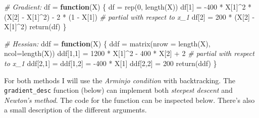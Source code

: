 \documentclass[
]{book}
\newenvironment{Shaded}{\begin{snugshade}}{\end{snugshade}}
\newcommand{\AttributeTok}[1]{\textcolor[rgb]{0.77,0.63,0.00}{#1}}
\newcommand{\CommentTok}[1]{\textcolor[rgb]{0.56,0.35,0.01}{\textit{#1}}}
\newcommand{\ControlFlowTok}[1]{\textcolor[rgb]{0.13,0.29,0.53}{\textbf{#1}}}
\newcommand{\DecValTok}[1]{\textcolor[rgb]{0.00,0.00,0.81}{#1}}
\newcommand{\FunctionTok}[1]{\textcolor[rgb]{0.00,0.00,0.00}{#1}}
\newcommand{\NormalTok}[1]{#1}
\newcommand{\OtherTok}[1]{\textcolor[rgb]{0.56,0.35,0.01}{#1}}
\newcommand{\SpecialCharTok}[1]{\textcolor[rgb]{0.00,0.00,0.00}{#1}}
\begin{document}
\begin{Shaded}
\begin{Highlighting}[]
\CommentTok{\# Gradient:}
\NormalTok{df }\OtherTok{=} \ControlFlowTok{function}\NormalTok{(X) \{}
\NormalTok{  df }\OtherTok{=} \FunctionTok{rep}\NormalTok{(}\DecValTok{0}\NormalTok{, }\FunctionTok{length}\NormalTok{(X))}
\NormalTok{  df[}\DecValTok{1}\NormalTok{] }\OtherTok{=} \SpecialCharTok{{-}}\DecValTok{400} \SpecialCharTok{*}\NormalTok{ X[}\DecValTok{1}\NormalTok{]}\SpecialCharTok{\^{}}\DecValTok{2} \SpecialCharTok{*}\NormalTok{ (X[}\DecValTok{2}\NormalTok{] }\SpecialCharTok{{-}}\NormalTok{ X[}\DecValTok{1}\NormalTok{]}\SpecialCharTok{\^{}}\DecValTok{2}\NormalTok{) }\SpecialCharTok{{-}} \DecValTok{2} \SpecialCharTok{*}\NormalTok{ (}\DecValTok{1} \SpecialCharTok{{-}}\NormalTok{ X[}\DecValTok{1}\NormalTok{]) }\CommentTok{\# partial with respect to x\_1}
\NormalTok{  df[}\DecValTok{2}\NormalTok{] }\OtherTok{=} \DecValTok{200} \SpecialCharTok{*}\NormalTok{ (X[}\DecValTok{2}\NormalTok{] }\SpecialCharTok{{-}}\NormalTok{ X[}\DecValTok{1}\NormalTok{]}\SpecialCharTok{\^{}}\DecValTok{2}\NormalTok{)}
  \FunctionTok{return}\NormalTok{(df)}
\NormalTok{\}}

\CommentTok{\# Hessian:}
\NormalTok{ddf }\OtherTok{=} \ControlFlowTok{function}\NormalTok{(X) \{}
\NormalTok{  ddf }\OtherTok{=} \FunctionTok{matrix}\NormalTok{(}\AttributeTok{nrow =} \FunctionTok{length}\NormalTok{(X), }\AttributeTok{ncol=}\FunctionTok{length}\NormalTok{(X))}
\NormalTok{  ddf[}\DecValTok{1}\NormalTok{,}\DecValTok{1}\NormalTok{] }\OtherTok{=} \DecValTok{1200} \SpecialCharTok{*}\NormalTok{ X[}\DecValTok{1}\NormalTok{]}\SpecialCharTok{\^{}}\DecValTok{2} \SpecialCharTok{{-}} \DecValTok{400} \SpecialCharTok{*}\NormalTok{ X[}\DecValTok{2}\NormalTok{] }\SpecialCharTok{+} \DecValTok{2} \CommentTok{\# partial with respect to x\_1}
\NormalTok{  ddf[}\DecValTok{2}\NormalTok{,}\DecValTok{1}\NormalTok{] }\OtherTok{=}\NormalTok{ ddf[}\DecValTok{1}\NormalTok{,}\DecValTok{2}\NormalTok{] }\OtherTok{=} \SpecialCharTok{{-}}\DecValTok{400} \SpecialCharTok{*}\NormalTok{ X[}\DecValTok{1}\NormalTok{]}
\NormalTok{  ddf[}\DecValTok{2}\NormalTok{,}\DecValTok{2}\NormalTok{] }\OtherTok{=} \DecValTok{200}
  \FunctionTok{return}\NormalTok{(ddf)}
\NormalTok{\}}
\end{Highlighting}
\end{Shaded}

For both methods I will use the \emph{Arminjo condition} with backtracking. The \texttt{gradient\_desc} function (below) can implement both \emph{steepest descent} and \emph{Newton's method}. The code for the function can be inspected below. There's also a small description of the different arguments.
\end{document}
